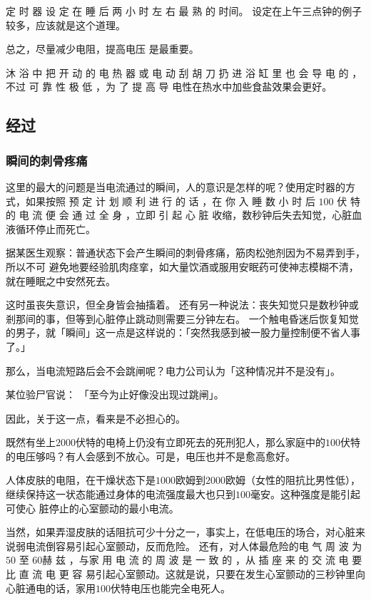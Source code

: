 \documentclass[UTF8]{ctexart}
\begin{document}
定 时 器 设 定 在 睡 后 两 小 时 左 右 最 熟 的 时间。
设定在上午三点钟的例子较多，应该就是这个道理。

总之，尽量减少电阻，提高电压 是最重要。

沐 浴 中 把 开 动 的 电 热 器 或 电 动 刮 胡 刀 扔 进 浴 缸 里 也 会 导 电 的 ，不过 可 靠 性 极 低 ，为 了 提 高 导 电性在热水中加些食盐效果会更好。

\subsection{经过}

\subsubsection*{瞬间的刺骨疼痛}

这里的最大的问题是当电流通过的瞬间，人的意识是怎样的呢？使用定时器的方式，如果按照 预 定 计 划 顺 利 进 行 的 话 ，在 你 入 睡 数 小 时 后 $100$ 伏 特 的 电 流 便 会 通 过 全 身 ，立即 引 起 心 脏 收缩，数秒钟后失去知觉，心脏血液循环停止而死亡。

据某医生观察：普通状态下会产生瞬间的刺骨疼痛，筋肉松弛剂因为不易弄到手，所以不可 避免地要经验肌肉痉挛，如大量饮酒或服用安眠药可使神志模糊不清，就在睡眠之中安然死去。

这时虽丧失意识，但全身皆会抽搐着。
还有另一种说法：丧失知觉只是数秒钟或剎那间的事，但等到心脏停止跳动则需要三分钟左右。
一个触电昏迷后恢复知觉的男子，就「瞬间」这一点是这样说的：「突然我感到被一股力量控制便不省人事了。」

那么，当电流短路后会不会跳闸呢？电力公司认为「这种情况并不是没有」。

某位验尸官说：
「至今为止好像没出现过跳闸」。

因此，关于这一点，看来是不必担心的。

既然有坐上$2000$伏特的电椅上仍没有立即死去的死刑犯人，那么家庭中的$100$伏特的电压够吗？有人会感到不放心。可是，电压也并不是愈高愈好。

人体皮肤的电阻，在干燥状态下是$1000$欧姆到$2000$欧姆（女性的阻抗比男性低），
继续保持这一状态能通过身体的电流强度最大也只到$100$毫安。这种强度是能引起可使心
脏停止的心室颤动的最小电流。

当然，如果弄湿皮肤的话阻抗可少十分之一，事实上，在低电压的场合，对心脏来说弱电流倒容易引起心室颤动，反而危险。
还有，对人体最危险的电 气 周 波 为 $50$ 至 $60$赫 兹 ，与家 用 电 流 的 周 波 是 一 致 的 ，从 插 座 来 的 交 流 电 要 比 直 流 电 更 容 易引起心室颤动。这就是说，只要在发生心室颤动的三秒钟里向心脏通电的话，家用$100$伏特电压也能完全电死人。
\end{document}
